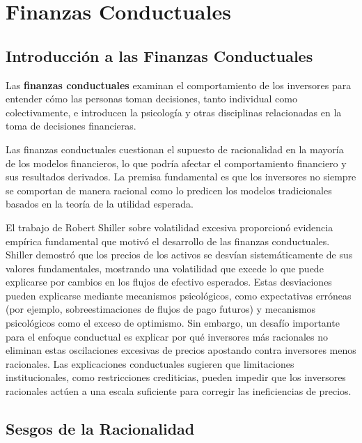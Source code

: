 \section{Finanzas Conductuales}

\subsection{Introducción a las Finanzas Conductuales}

\begin{definicion}
Las \textbf{finanzas conductuales} examinan el comportamiento de los inversores para entender cómo las personas toman decisiones, tanto individual como colectivamente, e introducen la psicología y otras disciplinas relacionadas en la toma de decisiones financieras.
\end{definicion}

Las finanzas conductuales cuestionan el supuesto de racionalidad en la mayoría de los modelos financieros, lo que podría afectar el comportamiento financiero y sus resultados derivados. La premisa fundamental es que los inversores no siempre se comportan de manera racional como lo predicen los modelos tradicionales basados en la teoría de la utilidad esperada.

El trabajo de Robert Shiller sobre volatilidad excesiva proporcionó evidencia empírica fundamental que motivó el desarrollo de las finanzas conductuales. Shiller demostró que los precios de los activos se desvían sistemáticamente de sus valores fundamentales, mostrando una volatilidad que excede lo que puede explicarse por cambios en los flujos de efectivo esperados. Estas desviaciones pueden explicarse mediante mecanismos psicológicos, como expectativas erróneas (por ejemplo, sobreestimaciones de flujos de pago futuros) y mecanismos psicológicos como el exceso de optimismo. Sin embargo, un desafío importante para el enfoque conductual es explicar por qué inversores más racionales no eliminan estas oscilaciones excesivas de precios apostando contra inversores menos racionales. Las explicaciones conductuales sugieren que limitaciones institucionales, como restricciones crediticias, pueden impedir que los inversores racionales actúen a una escala suficiente para corregir las ineficiencias de precios.

\subsection{Sesgos de la Racionalidad}

